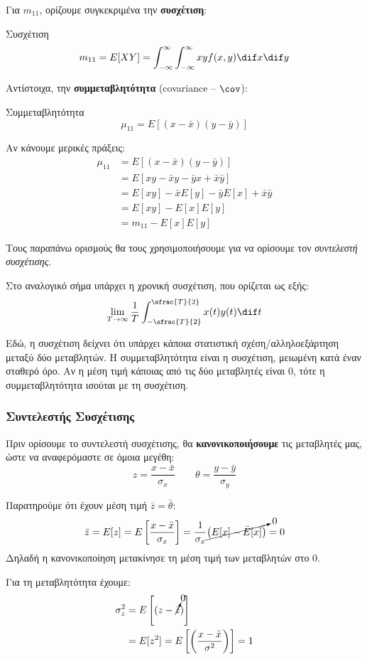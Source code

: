 \documentclass[11pt,a4paper,notitlepage,fleqn,final]{article}
\begin{document}
Για \( m_{11} \), ορίζουμε συγκεκριμένα την \textbf{συσχέτιση}:
\begin{defn}{Συσχέτιση}{}
	\[
	m_{11} = E[XY] = \int_{-\infty}^{\infty} \int_{-\infty}^{\infty}
	xy f(x,y)\dif x \dif y
	\]
\end{defn}

Αντίστοιχα, την \textbf{συμμεταβλητότητα} (covariance –
\( \cov \)):
\begin{defn}{Συμμεταβλητότητα}{}
	\[
	\mu_{11} = E\left[
	(x-\bar x)(y-\bar y)
	\right]
	\]
\end{defn}

Αν κάνουμε μερικές πράξεις:
\begin{align*}
	\mu_{11} &= E\left[(x-\bar x)(y-\bar y)\right] \\
	&= E[xy-\bar x y-\bar y x +\bar x\bar y] \\
	&= E[xy]-\bar xE[y]-\bar y E[x] +\bar x \bar y \\
	&= E[xy] - E[x]E[y] \\
	&= m_{11} - E[x]E[y]
\end{align*}

Τους παραπάνω ορισμούς θα τους χρησιμοποιήσουμε για να ορίσουμε τον
\textit{συντελεστή συσχέτισης}.

Στο αναλογικό σήμα υπάρχει η χρονική συσχέτιση, που ορίζεται ως εξής:
\[
\lim_{T\to \infty} \frac{1}{T} \int_{-\sfrac{T}{2} }^{\sfrac{T}{2} }
x(t)y(t)\dif t
\]

Εδώ, η συσχέτιση δείχνει ότι υπάρχει κάποια στατιστική
σχέση/αλληλοεξάρτηση μεταξύ δύο μεταβλητών. Η συμμεταβλητότητα είναι
η συσχέτιση, μειωμένη κατά έναν σταθερό όρο. Αν η μέση τιμή κάποιας
από τις δύο μεταβλητές είναι 0, τότε η συμμεταβλητότητα ισούται με τη
συσχέτιση.

\subsubsection{Συντελεστής Συσχέτισης}

Πριν ορίσουμε το συντελεστή συσχέτισης, θα \textbf{κανονικοποιήσουμε}
τις μεταβλητές μας, ώστε να αναφερόμαστε σε όμοια μεγέθη:
\[
z=\frac{x-\bar x}{\sigma_x}
\qquad \theta = \frac{y-\bar y}{\sigma_y}
\]

Παρατηρούμε ότι έχουν μέση τιμή \( \bar z=\bar \theta \):
\[
\bar z = E[z]=E\left[\frac{x-\bar x}{\sigma_x}\right]
= \frac{1}{\sigma_x}\cancelto{0}{\left(E[x]-\bar E[x]\right)} = 0
\]
Δηλαδή η κανονικοποίηση μετακίνησε τη μέση τιμή των μεταβλητών στο 0.

Για τη μεταβλητότητα έχουμε:
\begin{align*}
\sigma_z^2 &= E\left[(z-\cancelto{0}{\bar z})\right]
\\ &= E[z^2] = E\left[\left(\frac{x-\bar x}{\sigma^2}\right)\right]
= 1
\end{align*}
\end{document}
